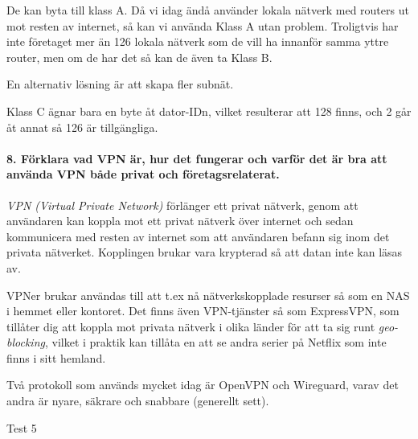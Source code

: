 De kan byta till klass A. Då vi idag ändå använder lokala nätverk med routers ut mot resten av internet, så kan vi använda Klass A utan problem. Troligtvis har inte företaget mer än 126 lokala nätverk som de vill ha innanför samma yttre router, men om de har det så kan de även ta Klass B.

En alternativ lösning är att skapa fler subnät.

Klass C ägnar bara en byte åt dator-IDn, vilket resulterar att 128 finns, och 2 går åt annat så 126 är tillgängliga.

\paragraph{8. Förklara vad VPN är, hur det fungerar och varför det är bra att använda VPN både privat och företagsrelaterat.}

\textit{VPN (Virtual Private Network)} förlänger ett privat nätverk, genom att användaren kan koppla mot ett privat nätverk över internet och sedan kommunicera med resten av internet som att användaren befann sig inom det privata nätverket. Kopplingen brukar vara krypterad så att datan inte kan läsas av.

VPNer brukar användas till att t.ex nå nätverkskopplade resurser så som en NAS i hemmet eller kontoret. Det finns även VPN-tjänster så som ExpressVPN, som tillåter dig att koppla mot privata nätverk i olika länder för att ta sig runt \textit{geo-blocking}, vilket i praktik kan tillåta en att se andra serier på Netflix som inte finns i sitt hemland.

Två protokoll som används mycket idag är OpenVPN och Wireguard, varav det andra är nyare, säkrare och snabbare (generellt sett).

Test 5
















